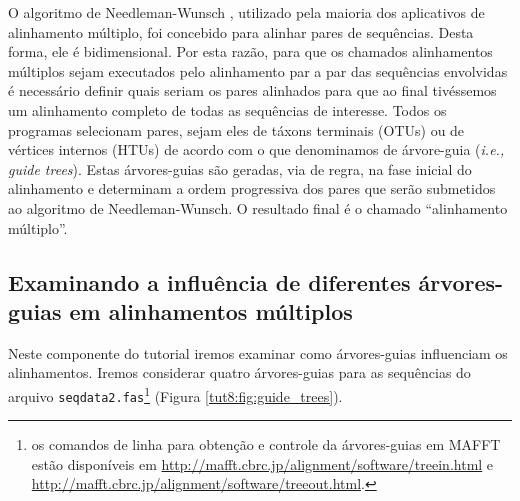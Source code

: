 \begin{refsection}
O algoritmo de Needleman-Wunsch \parencite{Needleman_and_Wunsch_1970}, utilizado pela maioria dos aplicativos de alinhamento múltiplo, foi concebido para alinhar pares de sequências. Desta forma, ele é bidimensional. Por esta razão, para que os chamados alinhamentos múltiplos sejam executados pelo alinhamento par a par das sequências envolvidas é necessário definir quais seriam os pares alinhados para que ao final tivéssemos um alinhamento completo de todas as sequências de interesse. Todos os programas selecionam pares, sejam eles de táxons terminais (OTUs) ou de vértices internos (HTUs) de acordo com o que denominamos de árvore-guia (\textit{i.e., guide trees}). Estas árvores-guias são geradas, via de regra, na fase inicial do alinhamento \parencite[consulte ][]{Phillips_et_al_2000} e determinam a ordem progressiva dos pares que serão submetidos ao algoritmo de Needleman-Wunsch. O resultado final é o chamado ``alinhamento múltiplo''.

\subsection{Examinando a influência de diferentes árvores-guias em alinhamentos múltiplos}\label{tut8:guide_tree:trees}

Neste componente do tutorial iremos examinar como árvores-guias influenciam os alinhamentos. Iremos considerar quatro árvores-guias para as sequências do arquivo \texttt{seqdata2.fas}\footnote{ os comandos de linha para obtenção e controle da árvores-guias em MAFFT estão disponíveis em \url{http://mafft.cbrc.jp/alignment/software/treein.html} e \url{http://mafft.cbrc.jp/alignment/software/treeout.html}.} (Figura \ref{tut8:fig:guide_trees}).\\


\end{refsection}
